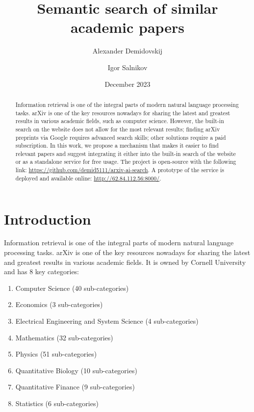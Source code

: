 \documentclass{article}
\title{Semantic search of similar academic papers}
\author{Alexander Demidovskij \and Igor Salnikov}
\date{December 2023}
\begin{document}
\maketitle

\begin{abstract}
    Information retrieval is one of the integral parts of modern natural language processing tasks. arXiv is one of the key resources nowadays for sharing the latest and greatest results in various academic fields, such as computer science. However, the built-in search on the website does not allow for the most relevant results; finding arXiv preprints via Google requires advanced search skills; other solutions require a paid subscription. In this work, we propose a mechanism that makes it easier to find relevant papers and suggest integrating it either into the built-in search of the website or as a standalone service for free usage. The project is open-source with the following link: \url{https://github.com/demid5111/arxiv-ai-search}. A prototype of the service is deployed and available online: \url{http://62.84.112.56:8000/}.
\end{abstract}

\section{Introduction}
    Information retrieval is one of the integral parts of modern natural language processing tasks. arXiv is one of the key resources nowadays for sharing the latest and greatest results in various academic fields. It is owned by Cornell University and has 8 key categories:
    
    \begin{enumerate}
        \item Computer Science (40 sub-categories)
        \item Economics (3 sub-categories)
        \item Electrical Engineering and System Science (4 sub-categories)
        \item Mathematics (32 sub-categories)
        \item Physics (51 sub-categories)
        \item Quantitative Biology (10 sub-categories)
        \item Quantitative Finance (9 sub-categories)
        \item Statistics (6 sub-categories)
    \end{enumerate}
    
\end{document}
